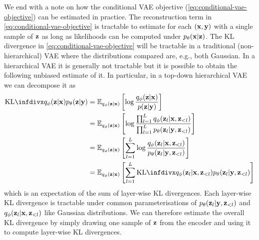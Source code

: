 We end with a note on how the conditional VAE objective (\cref{eq:conditional-vae-objective}) can be estimated in practice. The reconstruction term in \cref{eq:conditional-vae-objective} is tractable to estimate for each $({\mathbf{x}},{\mathbf{y}})$ with a single sample of ${\mathbf{z}}$ as long as likelihoods can be computed under $p_\theta({\mathbf{x}}|{\mathbf{z}})$. The KL divergence in \cref{eq:conditional-vae-objective} will be tractable in  a traditional (non-hierarchical) VAE where the distributions compared are, e.g., both Gaussian. In a hierarchical VAE it is generally not tractable but it is possible to obtain the following unbiased estimate of it. In particular, in a top-down hierarchical VAE~\citep{vahdat2020nvae,child2020very} we can decompose it as
\begin{align}
    \kl{q_\phi(\rvz|\rvx)}{p_\theta(\rvz|\rvy)} &= \EX_{q_\phi(\rvz|\rvx)} \left[  \log \frac{q_\phi(\rvz|\rvx)}{p(\rvz|\rvy)} \right] \\
    &= \EX_{q_\phi(\rvz|\rvx)} \left[ \log \frac{\prod_{l=1}^L q_\phi(\rvz_l|\rvx,\rvz_{<l})}{\prod_{l=1}^L p_\theta(\rvz_l|\rvy,\rvz_{<l})} \right] \\
    &= \EX_{q_\phi(\rvz|\rvx)} \left[ \sum_{l=1}^L \log \frac{q_\phi(\rvz_l|\rvx,\rvz_{<l})}{p_\theta(\rvz_l|\rvy,\rvz_{<l})} \right] \\
    &= \EX_{q_\phi(\rvz|\rvx)} \left[ \sum_{l=1}^L \kl{q_\phi(\rvz_l|\rvx,\rvz_{<l})}{p_\theta(\rvz_l|\rvy,\rvz_{<l})} \right]
\end{align}
which is an expectation of the sum of layer-wise KL divergences. Each layer-wise KL divergence is tractable under common parameterisations of $p_\theta({\mathbf{z}}_l|{\mathbf{y}},{\mathbf{z}}_{<l})$ and $q_\phi({\mathbf{z}}_l|{\mathbf{x}},{\mathbf{z}}_{<l})$ like Gaussian distributions. We can therefore estimate the overall KL divergence by simply drawing one sample of ${\mathbf{z}}$ from the encoder and using it to compute layer-wise KL divergences.


